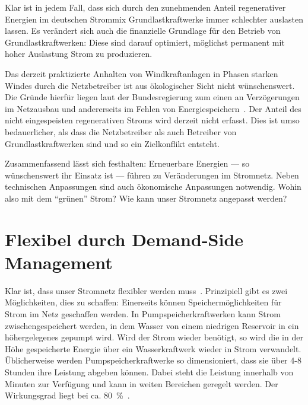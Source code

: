 \documentclass[12pt,BCOR=8.5mm]{scrartcl}
\begin{document}
Klar ist in jedem Fall, dass sich durch den zunehmenden Anteil
regenerativer Energien im deutschen Strommix Grundlastkraftwerke immer
schlechter auslasten lassen.  Es verändert sich auch die finanzielle
Grundlage für den Betrieb von Grundlastkraftwerken: Diese sind darauf
optimiert, möglichst permanent mit hoher Auslastung Strom zu
produzieren. 

Das derzeit praktizierte Anhalten von Windkraftanlagen in Phasen starken
Windes durch die Netzbetreiber ist aus ökologischer Sicht nicht
wünschenswert. Die Gründe hierfür liegen laut der Bundesregierung zum
einen an Verzögerungen im Netzausbau und andererseits im Fehlen von
Energiespeichern~\cite{bundesreg2010kleineanfrage}. Der Anteil des nicht
eingespeisten regenerativen Stroms wird derzeit nicht erfasst. Dies ist
umso bedauerlicher, als dass die Netzbetreiber als auch Betreiber von
Grundlastkraftwerken sind und so ein Zielkonflikt entsteht.

Zusammenfassend lässt sich festhalten: Erneuerbare Energien --- so
wünschenswert ihr Einsatz ist --- führen zu Veränderungen im Stromnetz.
Neben technischen Anpassungen sind auch ökonomische Anpassungen
notwendig. Wohin also mit dem "`grünen"' Strom? Wie kann unser Stromnetz
angepasst werden?

\section{Flexibel durch Demand-Side Management}\label{sec:demand-side_management}

Klar ist, dass unser Stromnetz flexibler werden
muss~\cite{geller2010smartgrid}. Prinzipiell gibt es zwei Möglichkeiten,
dies zu schaffen: Einerseits können Speichermöglichkeiten für Strom im
Netz geschaffen werden. In Pumpspeicherkraftwerken kann Strom
zwischengespeichert werden, in dem Wasser von einem niedrigen Reservoir
in ein höhergelegenes gepumpt wird.  Wird der Strom wieder benötigt, so
wird die in der Höhe gespeicherte Energie über ein Wasserkraftwerk
wieder in Strom verwandelt.  Üblicherweise werden Pumpspeicherkraftwerke
so dimensioniert, dass sie über 4-8 Stunden ihre Leistung abgeben
können. Dabei steht die Leistung innerhalb von Minuten zur Verfügung und
kann in weiten Bereichen geregelt werden. Der Wirkungsgrad liegt bei ca.
80~\%~\cite{wikipedia10pumpspeicher}.
\end{document}
